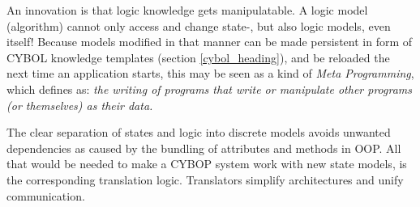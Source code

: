 An innovation is that logic knowledge gets manipulatable. A logic model
(algorithm) cannot only access and change state-, but also logic models, even
itself! Because models modified in that manner can be made persistent in form
of CYBOL knowledge templates (section \ref{cybol_heading}), and be reloaded the
next time an application starts, this may be seen as a kind of
\emph{Meta Programming}, which \cite{wikipedia} defines as: \textit{the writing
of programs that write or manipulate other programs (or themselves) as their
data.}

The clear separation of states and logic into discrete models avoids unwanted
dependencies as caused by the bundling of attributes and methods in OOP. All
that would be needed to make a CYBOP system work with new state models, is the
corresponding translation logic. Translators \cite{hellerkunze} simplify
architectures and unify communication.
